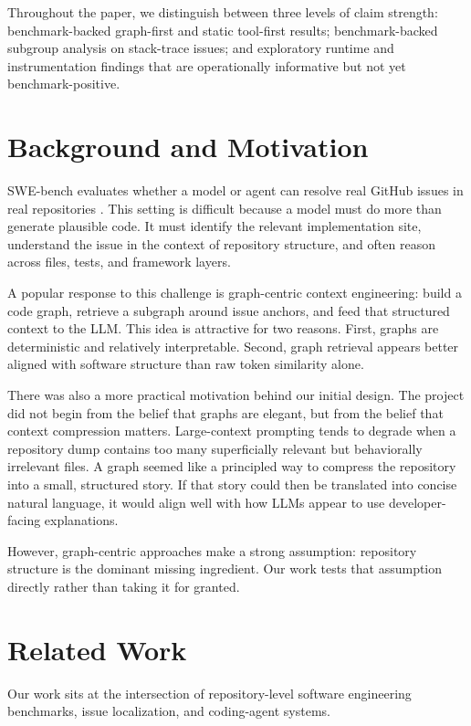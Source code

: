 \documentclass[11pt]{article}
\begin{document}
Throughout the paper, we distinguish between three levels of claim strength: benchmark-backed graph-first and static tool-first results; benchmark-backed subgroup analysis on stack-trace issues; and exploratory runtime and instrumentation findings that are operationally informative but not yet benchmark-positive.

\section{Background and Motivation}

SWE-bench evaluates whether a model or agent can resolve real GitHub issues in real repositories \citep{jimenez2023swebench}. This setting is difficult because a model must do more than generate plausible code. It must identify the relevant implementation site, understand the issue in the context of repository structure, and often reason across files, tests, and framework layers.

A popular response to this challenge is graph-centric context engineering: build a code graph, retrieve a subgraph around issue anchors, and feed that structured context to the LLM. This idea is attractive for two reasons. First, graphs are deterministic and relatively interpretable. Second, graph retrieval appears better aligned with software structure than raw token similarity alone.

There was also a more practical motivation behind our initial design. The project did not begin from the belief that graphs are elegant, but from the belief that context compression matters. Large-context prompting tends to degrade when a repository dump contains too many superficially relevant but behaviorally irrelevant files. A graph seemed like a principled way to compress the repository into a small, structured story. If that story could then be translated into concise natural language, it would align well with how LLMs appear to use developer-facing explanations.

However, graph-centric approaches make a strong assumption: repository structure is the dominant missing ingredient. Our work tests that assumption directly rather than taking it for granted.

\section{Related Work}

Our work sits at the intersection of repository-level software engineering benchmarks, issue localization, and coding-agent systems.
\end{document}
